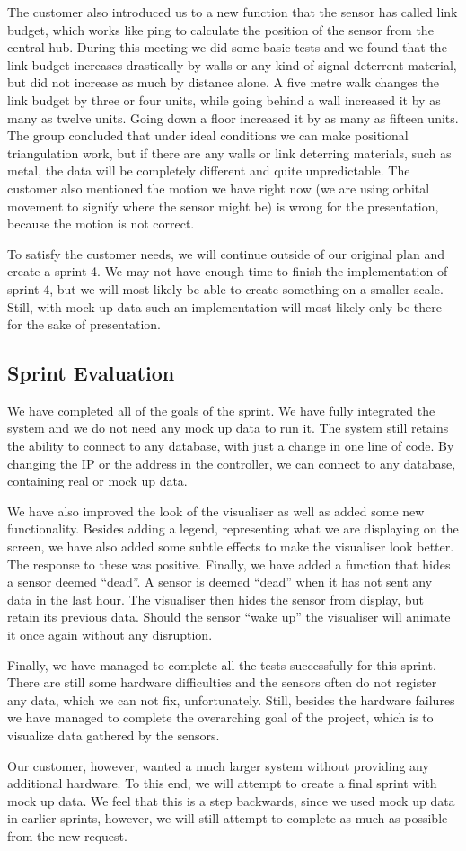 \documentclass[../document]{subfiles}
\begin{document}
The customer also introduced us to a new function that the sensor has called link budget, which works like ping to calculate the position of the sensor from the central hub. During this meeting we did some basic tests and we found that the link budget increases drastically by walls or any kind of signal deterrent material, but did not increase as much by distance alone. A five metre walk changes the link budget by three or four units, while going behind a wall increased it by as many as twelve units. Going down a floor increased it by as many as fifteen units. The group concluded that under ideal conditions we can make positional triangulation work, but if there are any walls or link deterring materials, such as metal, the data will be completely different and quite unpredictable. The customer also mentioned the motion we have right now (we are using orbital movement to signify where the sensor might be) is wrong for the presentation, because the motion is not correct. 

To satisfy the customer needs, we will continue outside of our original plan and create a sprint 4. We may not have enough time to finish the implementation of sprint 4, but we will most likely be able to create something on a smaller scale. Still, with mock up data such an implementation will most likely only be there for the sake of presentation.

\subsection{Sprint Evaluation}
We have completed all of the goals of the sprint. We have fully integrated the system and we do not need any mock up data to run it. The system still retains the ability to connect to any database, with just a change in one line of code. By changing the IP or the address in the controller, we can connect to any database, containing real or mock up data.

We have also improved the look of the visualiser as well as added some new functionality. Besides adding a legend, representing what we are displaying on the screen, we have also added some subtle effects to make the visualiser look better. The response to these was positive. Finally, we have added a function that hides a sensor deemed “dead”. A sensor is deemed “dead” when it has not sent any data in the last hour. The visualiser then hides the sensor from display, but retain its previous data. Should the sensor “wake up” the visualiser will animate it once again without any disruption.

Finally, we have managed to complete all the tests successfully for this sprint. There are still some hardware difficulties and the sensors often do not register any data, which we can not fix, unfortunately. Still, besides the hardware failures we have managed to complete the overarching goal of the project, which is to visualize data gathered by the sensors. 

Our customer, however, wanted a much larger system without providing any additional hardware. To this end, we will attempt to create a final sprint with mock up data. We feel that this is a step backwards, since we used mock up data in earlier sprints, however, we will still attempt to complete as much as possible from the new request.
\end{document}
